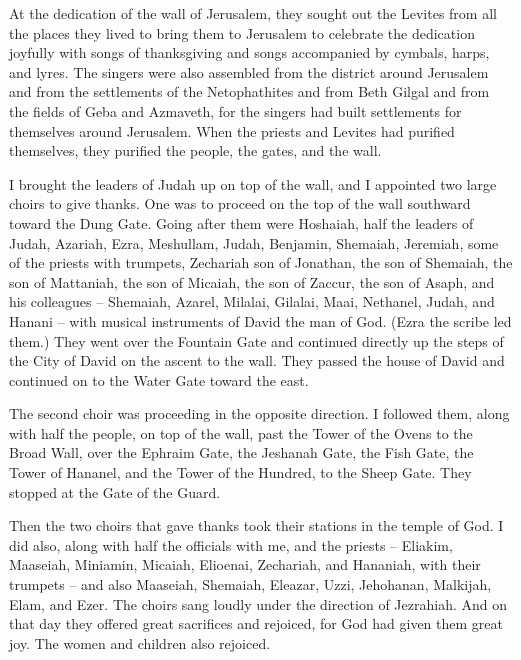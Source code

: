 {\par }{\PP {}At the dedication
of the wall
of Jerusalem,
they sought
out the
Levites
from all
the places
they lived to bring
them to Jerusalem
to celebrate
the dedication
joyfully
with songs of thanksgiving
and songs
accompanied by cymbals,
harps,
and lyres.
The singers
were also assembled
from
the district
around
Jerusalem
and from
the settlements
of the Netophathites
and from Beth
Gilgal
and from the fields
of Geba
and Azmaveth,
for
the singers
had built
settlements
for themselves
around
Jerusalem.
When the priests
and Levites
had purified
themselves, they purified
the
people,
the gates,
and the wall.
\par }{\PP {}I brought
the
leaders
of Judah
up on
top of the wall,
and I appointed
two
large
choirs to give thanks.
One was to proceed
on
the top of the wall
southward
toward the Dung
Gate.
Going
after
them were Hoshaiah,
half
the leaders
of Judah,
Azariah,
Ezra,
Meshullam,
Judah,
Benjamin,
Shemaiah,
Jeremiah,
some of the priests
with trumpets,
Zechariah
son
of Jonathan,
the son
of Shemaiah,
the son
of Mattaniah,
the son
of Micaiah,
the son
of Zaccur,
the son
of Asaph,
and his colleagues
– Shemaiah,
Azarel,
Milalai,
Gilalai,
Maai,
Nethanel,
Judah,
and Hanani
– with musical
instruments
of David
the man
of God.
(Ezra
the scribe
led them.)
They went over
the Fountain
Gate
and continued directly
up
the steps
of the City
of David
on the ascent
to the wall.
They passed the house
of David
and continued
on to
the Water
Gate
toward the east.
\par }{\PP {}The second
choir
was proceeding
in the opposite
direction. I
followed
them, along with half
the people,
on
top of the wall,
past the Tower
of the Ovens
to
the Broad
Wall,
over
the Ephraim
Gate,
the Jeshanah
Gate,
the Fish
Gate,
the Tower
of Hananel,
and the Tower
of the Hundred,
to
the Sheep
Gate.
They stopped
at the Gate
of the Guard.
\par }{\PP {}Then
the two
choirs
that gave thanks
took their stations in the temple
of God.
I
did also, along with half
the officials
with me,
and the priests
– Eliakim,
Maaseiah,
Miniamin,
Micaiah,
Elioenai,
Zechariah,
and Hananiah,
with their trumpets –
and also Maaseiah,
Shemaiah,
Eleazar,
Uzzi,
Jehohanan,
Malkijah,
Elam,
and Ezer.
The choirs
sang
loudly under the direction of Jezrahiah.
And on that day
they offered
great
sacrifices
and rejoiced,
for
God
had given them great
joy.
The women
and children
also
rejoiced.
}
